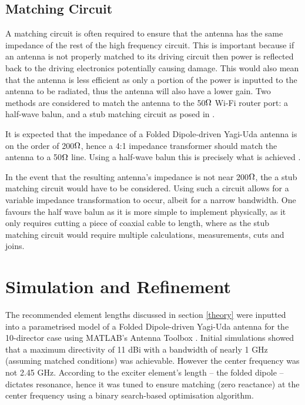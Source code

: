 \documentclass[10pt,twocolumn,hidelinks]{witseiepaper}
\begin{document}
\subsection {Matching Circuit}
A matching circuit is often required to ensure that the antenna has the
same impedance of the rest of the high frequency circuit. This is important
because if an antenna is not properly matched to its driving circuit then
power is reflected back to the driving electronics potentially causing
damage. This would also mean that the antenna is less efficient as only a
portion of the power is inputted to the antenna to be radiated, thus the
antenna will also have a lower gain. Two methods are considered to match
the antenna to the 50$\ohm$ Wi-Fi router port: a half-wave balun, and a
stub matching circuit as posed in \cite[p. 33,36]{clark_fourie_2002}.

It is expected that the impedance of a Folded Dipole-driven Yagi-Uda
antenna is on the order of 200$\ohm$, hence a 4:1 impedance transformer
should match the antenna to a 50$\ohm$ line. Using a half-wave balun this
is precisely what is achieved \cite[p. 69]{clark_fourie_2002}.

In the event that the resulting antenna's impedance is not near 200$\ohm$,
the a stub matching circuit would have to be considered. Using such a
circuit allows for a variable impedance transformation to occur, albeit for
a narrow bandwidth. One favours the half wave balun as it is more simple to
implement physically, as it only requires cutting a piece of coaxial cable
to length, where as the stub matching circuit would require multiple
calculations, measurements, cuts and joins.

\section{Simulation and Refinement}
\label{simref}

The recommended element lengths discussed in section \ref{theory} were
inputted into a parametrised model of a Folded Dipole-driven Yagi-Uda
antenna for the 10-director case using MATLAB's Antenna Toolbox
\cite{matlabantenna}. Initial simulations showed that a maximum directivity
of 11 dBi with a bandwidth of nearly 1 GHz (assuming matched conditions)
was achievable. However the center frequency was not 2.45 GHz. According to
\cite[p. 69]{clark_fourie_2002} the exciter element's length -- the folded
dipole -- dictates resonance, hence it was tuned to ensure matching (zero
reactance) at the center frequency using a binary search-based optimisation
algorithm.
\end{document}
